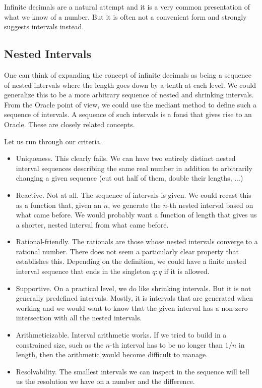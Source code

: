 \documentclass[12pt]{article}
\theoremstyle{remark}
\begin{document}
Infinite decimals are a natural attempt and it is a very common presentation of what we know of a number. But it is often not a convenient form and strongly suggests intervals instead. 

\subsection{Nested Intervals}

One can think of expanding the concept of infinite decimals as being a sequence of nested intervals where the length goes down by a tenth at each level. We could generalize this to be a more arbitrary sequence of nested and shrinking intervals. From the Oracle point of view, we could use the mediant method to define such a sequence of intervals. A sequence of such intervals is a fonsi that gives rise to an Oracle. These are closely related concepts. 

Let us run through our criteria. 

\begin{itemize}
    \item Uniqueness. This clearly fails. We can have two entirely distinct nested interval sequences describing the same real number in addition to arbitrarily changing a given sequence (cut out half of them, double their lengths, ...)
    \item Reactive. Not at all. The sequence of intervals is given. We could recast this as a function that, given an $n$, we generate the $n$-th nested interval based on what came before. We would probably want a function of length that gives us a shorter, nested interval from what came before. 
    \item Rational-friendly. The rationals are those whose nested intervals converge to a rational number. There does not seem a particularly clear property that establishes this. Depending on the definition, we could have a finite nested interval sequence that ends in the singleton $q:q$ if it is allowed. 
    \item Supportive. On a practical level, we do like shrinking intervals. But it is not generally predefined intervals. Mostly, it is intervals that are generated when working and we would want to know that the given interval has a non-zero intersection with all the nested intervals. 
    \item Arithmeticizable. Interval arithmetic works. If we tried to build in a constrained size, such as the $n$-th interval has to be no longer than $1/n$ in length, then the arithmetic would become difficult to manage. 
    \item Resolvability. The smallest intervals we can inspect in the sequence will tell us the resolution we have on a number and the difference. 
\end{itemize}
\end{document}

